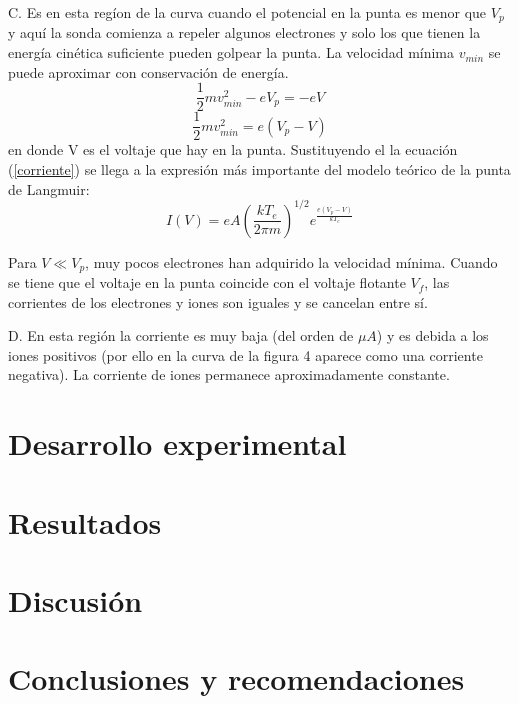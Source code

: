 \documentclass[letterpaper,12pt]{article}
\begin{document}
C. Es en  esta regíon de la curva cuando el potencial en la punta es menor que $V_p$ y aquí la sonda comienza a repeler algunos electrones y solo los que tienen la energía cinética suficiente pueden golpear la punta. La velocidad mínima $v_{min}$ se puede aproximar con conservación de energía.
$$\frac{1}{2}mv_{min}^2-eV_p=-eV$$
$$\frac{1}{2}mv_{min}^2=e(V_p-V)$$
en donde V es el voltaje que hay en la punta. Sustituyendo el la ecuación (\ref{corriente}) se llega a la expresión más importante del modelo teórico de la punta de Langmuir:
\begin{equation}\label{curva}
I(V)=eA\left( \frac{kT_e}{2\pi m} \right)^{1/2} e^{\frac{e(V_p-V)}{kT_e}}
\end{equation}

Para $V \ll V_p$, muy pocos electrones han adquirido la velocidad mínima. Cuando se tiene que el voltaje en la punta coincide con el voltaje flotante $V_f$, las corrientes de los electrones y iones son iguales y se cancelan entre sí.
 
 D. En esta región la corriente es muy baja (del orden de $\mu A$) y es debida a los iones positivos (por ello en la curva de la figura 4 aparece como una corriente negativa). La corriente de iones permanece aproximadamente constante.
 
 



\section{Desarrollo experimental}
\section{Resultados}

 
\section{Discusión}
\cite{bueno}


\section{Conclusiones y recomendaciones}
\end{document}
